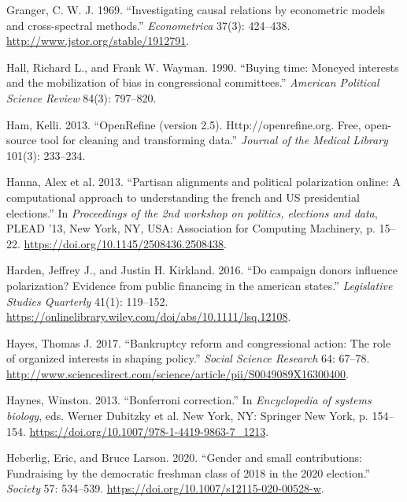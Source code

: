 \documentclass[12pt,]{article}
\begin{document}
\begin{CSLReferences}{1}{0}
\leavevmode{}%
Granger, C. W. J. 1969. {``Investigating causal relations by econometric
models and cross-spectral methods.''} \emph{Econometrica} 37(3):
424--438. \url{http://www.jstor.org/stable/1912791}.

\leavevmode{}%
Hall, Richard L., and Frank W. Wayman. 1990. {``Buying time: Moneyed
interests and the mobilization of bias in congressional committees.''}
\emph{American Political Science Review} 84(3): 797--820.

\leavevmode{}%
Ham, Kelli. 2013. {``OpenRefine (version 2.5). Http://openrefine.org.
Free, open-source tool for cleaning and transforming data.''}
\emph{Journal of the Medical Library} 101(3): 233--234.

\leavevmode{}%
Hanna, Alex et al. 2013. {``Partisan alignments and political
polarization online: A computational approach to understanding the
french and US presidential elections.''} In \emph{Proceedings of the 2nd
workshop on politics, elections and data}, PLEAD '13, New York, NY, USA:
Association for Computing Machinery, p. 15--22.
\url{https://doi.org/10.1145/2508436.2508438}.

\leavevmode{}%
Harden, Jeffrey J., and Justin H. Kirkland. 2016. {``Do campaign donors
influence polarization? Evidence from public financing in the american
states.''} \emph{Legislative Studies Quarterly} 41(1): 119--152.
\url{https://onlinelibrary.wiley.com/doi/abs/10.1111/lsq.12108}.

\leavevmode{}%
Hayes, Thomas J. 2017. {``Bankruptcy reform and congressional action:
The role of organized interests in shaping policy.''} \emph{Social
Science Research} 64: 67--78.
\url{http://www.sciencedirect.com/science/article/pii/S0049089X16300400}.

\leavevmode{}%
Haynes, Winston. 2013. {``Bonferroni correction.''} In
\emph{Encyclopedia of systems biology}, eds. Werner Dubitzky et al. New
York, NY: Springer New York, p. 154--154.
\url{https://doi.org/10.1007/978-1-4419-9863-7_1213}.

\leavevmode{}%
Heberlig, Eric, and Bruce Larson. 2020. {``Gender and small
contributions: Fundraising by the democratic freshman class of 2018 in
the 2020 election.''} \emph{Society} 57: 534--539.
\url{https://doi.org/10.1007/s12115-020-00528-w}.


\end{CSLReferences}
\end{document}

